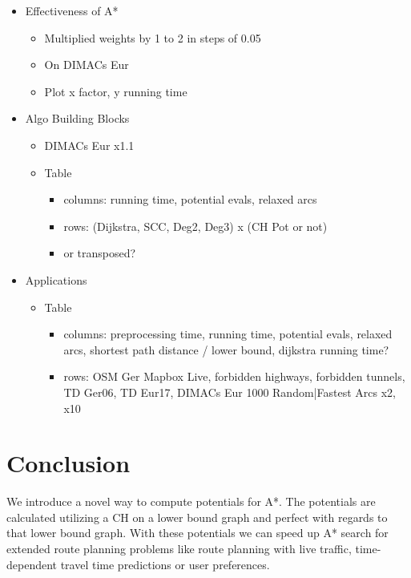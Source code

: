 \documentclass[a4paper,UKenglish,cleveref, autoref]{lipics-v2019}
\begin{document}
\begin{itemize}
\item Effectiveness of A*
	\begin{itemize}
  \item Multiplied weights by 1 to 2 in steps of 0.05
  \item On DIMACs Eur
  \item Plot x factor, y running time
  \end{itemize}

\item Algo Building Blocks
	\begin{itemize}
  \item DIMACs Eur x1.1
  \item Table
  	\begin{itemize}
    \item columns: running time, potential evals, relaxed arcs
    \item rows: (Dijkstra, SCC, Deg2, Deg3) x (CH Pot or not)
    \item or transposed?
		\end{itemize}
	\end{itemize}

\item Applications
	\begin{itemize}
  \item Table
  	\begin{itemize}
    \item columns: preprocessing time, running time, potential evals, relaxed arcs, shortest path distance / lower bound, dijkstra running time?
    \item rows: OSM Ger Mapbox Live, forbidden highways, forbidden tunnels, TD Ger06, TD Eur17, DIMACs Eur 1000 {Random|Fastest} Arcs {x2, x10}
		\end{itemize}
	\end{itemize}
\end{itemize}

\section{Conclusion}
\label{sec:conclusion}

We introduce a novel way to compute potentials for A*.
The potentials are calculated utilizing a CH on a lower bound graph and perfect with regards to that lower bound graph.
With these potentials we can speed up A* search for extended route planning problems like route planning with live traffic, time-dependent travel time predictions or user preferences.





\end{document}
